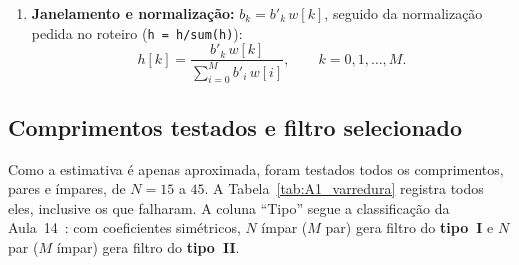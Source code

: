 \documentclass[11pt,a4paper]{article}
\begin{document}
\begin{enumerate}[leftmargin=1.6em, itemsep=2pt, topsep=3pt]
    \item[7.] \textbf{Janelamento e normalização:} $b_k = b'_k\,w[k]$, seguido da normalização pedida no roteiro (\texttt{h = h/sum(h)}):
    \begin{equation}
        h[k] = \frac{b'_k\,w[k]}{\sum_{i=0}^{M} b'_i\,w[i]}, \qquad k = 0, 1, \dots, M.
        \label{eq:hnorm}
    \end{equation}
\end{enumerate}

\subsection{Comprimentos testados e filtro selecionado}

Como a estimativa é apenas aproximada, foram testados todos os comprimentos, pares e ímpares, de $N = 15$ a $45$. A Tabela~\ref{tab:A1_varredura} registra todos eles, inclusive os que falharam. A coluna ``Tipo'' segue a classificação da Aula~14~\cite{aula14}: com coeficientes simétricos, $N$ ímpar ($M$ par) gera filtro do \textbf{tipo~I} e $N$ par ($M$ ímpar) gera filtro do \textbf{tipo~II}.
\end{document}
